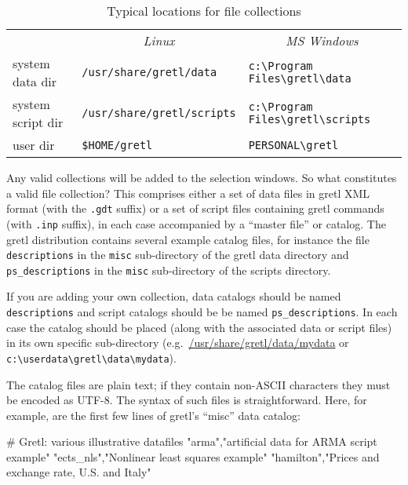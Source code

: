 \begin{table}[htbp]
  \begin{center}
    \begin{tabular}{lll}
      & \multicolumn{1}{c}{\textit{Linux}} & 
      \multicolumn{1}{c}{\textit{MS Windows}} \\
        system data dir & 
        {\small \verb+/usr/share/gretl/data+} &
        {\small \verb+c:\Program Files\gretl\data+} \\
        system script dir & 
        {\small \verb+/usr/share/gretl/scripts+} &
        {\small \verb+c:\Program Files\gretl\scripts+} \\
        user dir & 
        {\small \verb+$HOME/gretl+} &
        {\small \verb+PERSONAL\gretl+}\\
  \end{tabular}
 \end{center}
 \caption{Typical locations for file collections}
 \label{tab-colls}
\end{table}

Any valid collections will be added to the selection windows. So what
constitutes a valid file collection?  This comprises either a set of
data files in gretl XML format (with the \verb+.gdt+ suffix) or
a set of script files containing gretl commands (with \verb+.inp+
suffix), in each case accompanied by a ``master file'' or catalog.
The gretl distribution contains several example catalog files,
for instance the file \verb+descriptions+ in the \verb+misc+
sub-directory of the gretl data directory and
\verb+ps_descriptions+ in the \verb+misc+ sub-directory of the scripts
directory.

If you are adding your own collection, data catalogs should be named
\verb+descriptions+ and script catalogs should be be named
\verb+ps_descriptions+.  In each case the catalog should be placed
(along with the associated data or script files) in its own specific
sub-directory (e.g.\ \url{/usr/share/gretl/data/mydata} or
\verb+c:\userdata\gretl\data\mydata+).

The catalog files are plain text; if they contain non-ASCII characters
they must be encoded as UTF-8. The syntax of such files is
straightforward.  Here, for example, are the first few lines of
gretl's ``misc'' data catalog:

\begin{code}
# Gretl: various illustrative datafiles
"arma","artificial data for ARMA script example"
"ects_nls","Nonlinear least squares example"
"hamilton","Prices and exchange rate, U.S. and Italy"
\end{code}

